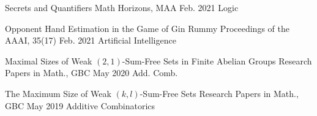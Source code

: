 


\begin{cventries}



\cventrylighttwo
  {Secrets and Quantifiers}
  {Math Horizons, MAA}
  {Feb. 2021}
  {Logic}


\cventrylighttwo
  {Opponent Hand Estimation in the Game of Gin Rummy}
  {Proceedings of the AAAI, 35(17)}
  {Feb. 2021}
  {Artificial Intelligence}


\cventrylighttwo
  {Maximal Sizes of Weak $(2,1)$-Sum-Free Sets in Finite Abelian Groups}
  {Research Papers in Math., GBC}
  {May 2020}
  {Add. Comb.}
  


\cventrylighttwo
  {The Maximum Size of Weak $(k,l)$-Sum-Free Sets}
  {Research Papers in Math., GBC}
  {May 2019}
  {Additive Combinatorics}



\end{cventries}